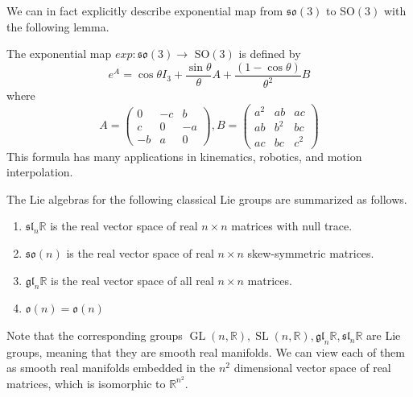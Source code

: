 \documentclass{article}
\DeclareMathOperator{\GL}{GL}
\DeclareMathOperator{\SL}{SL}
\begin{document}
      We can in fact explicitly describe exponential map from $\mathfrak{so}(3)$ to SO$(3)$ with the following lemma. 

      \begin{lemma}
        The exponential map $exp: \mathfrak{so}(3) \longrightarrow$ SO$(3)$ is defined by 
        \begin{equation}
          e^A = \cos{\theta} I_3 + \frac{\sin{\theta}}{\theta} A + \frac{(1 - \cos{\theta})}{\theta^2} B
        \end{equation}
        where 
        \begin{equation}
          A = \begin{pmatrix}
          0&-c&b\\c&0&-a\\-b&a&0
          \end{pmatrix}, B = \begin{pmatrix}
          a^2&ab&ac\\ab&b^2&bc\\ac&bc&c^2
          \end{pmatrix}
        \end{equation}
        This formula has many applications in kinematics, robotics, and motion interpolation. 
      \end{lemma}

      \begin{theorem}
      The Lie algebras for the following classical Lie groups are summarized as follows. 
      \begin{enumerate}
        \item $\mathfrak{sl}_n \mathbb{R}$ is the real vector space of real $n \times n$ matrices with null trace.
        \item $\mathfrak{so}(n)$ is the real vector space of real $n \times n$ skew-symmetric matrices. 
        \item $\mathfrak{gl}_n \mathbb{R}$ is the real vector space of all real $n \times n$ matrices.
        \item $\mathfrak{o}(n) = \mathfrak{o}(n)$
      \end{enumerate}
      \end{theorem}
      Note that the corresponding groups $\GL(n, \mathbb{R}), \SL(n, \mathbb{R}), \mathfrak{gl}_n \mathbb{R}, \mathfrak{sl}_n \mathbb{R}$ are Lie groups, meaning that they are smooth real manifolds. We can view each of them as smooth real manifolds embedded in the $n^2$ dimensional vector space of real matrices, which is isomorphic to $\mathbb{R}^{n^2}$. 
\end{document}
